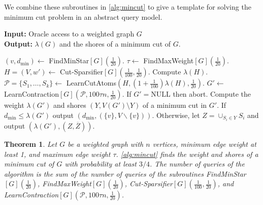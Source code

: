 \documentclass[10pt,a4paper]{article}
\newcommand{\Pcal}{\mathcal{P}}
\newcommand{\1}{\mathbf{1}}
\newtheorem{theorem}{Theorem}
\theoremstyle{definition}
\begin{document}
We combine these subroutines in \cref{alg:mincut} to give a template for solving the minimum cut problem in an abstract query model.
\begin{algorithm}[H]
\caption{Query algorithm for minimum cut}
\label{alg:mincut}
 \hspace*{\algorithmicindent} \textbf{Input:} Oracle access to a weighted graph $G$ \\
 \hspace*{\algorithmicindent} \textbf{Output:} $\lambda(G)$ and the shores of a minimum cut of $G$.
\begin{algorithmic}[1]
\State $(v,d_{\min}) \gets$ FindMinStar$[G](\frac{1}{20})$.
\State $\tau \gets$ FindMaxWeight$[G](\frac{1}{20})$.
\State $H = (V,w') \gets$ Cut-Sparsifier$[G](\frac{1}{100}, \frac{1}{20})$.
\State Compute $\lambda(H)$.
\State $\Pcal = \{ S_1,\dots,S_k \} \gets$ LearnCutAtoms$(H,(1+\frac{1}{100})\lambda(H),\frac{1}{20})$.
\State $G' \gets$ LearnContraction$[G](\Pcal, 100 \tau n, \frac{1}{20})$.  If $G' = \mathrm{NULL}$ then abort.
\State Compute the weight $\lambda(G')$ and shores $(Y,V(G') \setminus Y)$ of a minimum cut in $G'$.
\State If $d_{\min} \le \lambda(G')$ output $(d_{\min},(\{v\},V\backslash\{v\}))$. Otherwise, let $Z = \cup_{S_i \in Y} S_i$ and output $(\lambda(G'), (Z, \overline{Z}))$.
\end{algorithmic}
\end{algorithm}

\begin{theorem}
\label{thm:rsw_alg}
Let $G$ be a weighted graph with $n$ vertices, minimum edge weight at least 1, and maximum edge weight $\tau$. 
\cref{alg:mincut} finds the weight and shores of a minimum cut of $G$ with probability at least $3/4$.  The number of queries of the algorithm is the sum of the number of queries 
of the subroutines FindMinStar$[G](\frac{1}{20})$, FindMaxWeight$[G](\frac{1}{20})$, Cut-Sparsifier$[G](\frac{1}{100}, \frac{1}{20})$, and LearnContraction$[G](\Pcal, 100 \tau n, \frac{1}{20})$.
\end{theorem}
\end{document}
